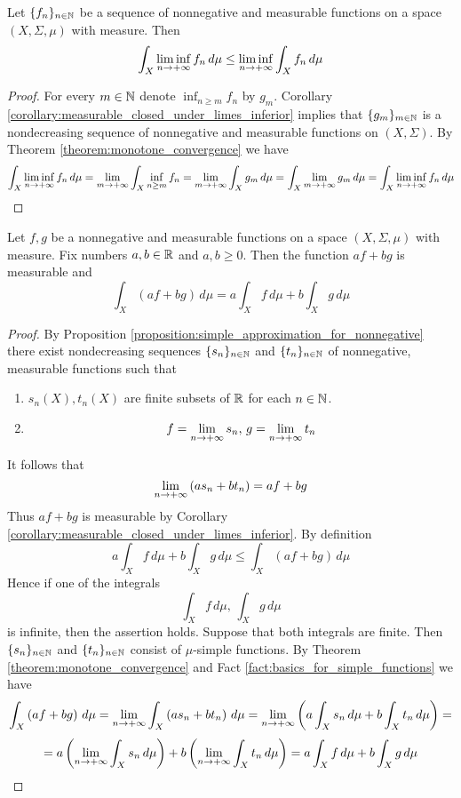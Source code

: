 \documentclass[10pt]{amsart}
\begin{document}
\begin{theorem}\label{theorem:fatous_lemma}
	Let $\{f_n\}_{n\in {\mathbb N}}$ be a sequence of nonnegative and measurable functions on a space $(X,\Sigma,\mu)$ with measure. Then
	$$\int_X\liminf_{n\rightarrow +\infty}f_n\,d\mu \leq \liminf_{n\rightarrow +\infty}\int_Xf_n\,d\mu$$
\end{theorem}
\begin{proof}
	For every $m\in {\mathbb N}$ denote $\inf_{n\geq m}f_n$ by $g_m$. Corollary \ref{corollary:measurable_closed_under_limes_inferior} implies that $\{g_m\}_{m\in {\mathbb N}}$ is a nondecreasing sequence of nonnegative and measurable functions on $(X,\Sigma)$. By Theorem \ref{theorem:monotone_convergence} we have
	$$\int_X\liminf_{n\rightarrow +\infty}f_n\,d\mu = \lim_{m\rightarrow +\infty}\int_X\inf_{n\geq m}f_n = \lim_{m\rightarrow +\infty}\int_Xg_m\,d\mu = \int_X\lim_{m\rightarrow +\infty}g_m\,d\mu = \int_X\liminf_{n\rightarrow +\infty}f_n\,d\mu$$
\end{proof}

\begin{proposition}\label{proposition:integral_is_linear}
	Let $f,g$ be a nonnegative and measurable functions on a space $(X,\Sigma,\mu)$ with measure. Fix numbers $a, b\in {\mathbb R}$ and $a, b \geq 0$. Then the function $a f+b  g$ is measurable and
	$$\int_X\left(a f+b  g\right)\,d\mu = a \int_Xf\,d\mu + b \int_Xg\,d\mu$$
\end{proposition}
\begin{proof}
	By Proposition \ref{proposition:simple_approximation_for_nonnegative} there exist nondecreasing sequences $\{s_n\}_{n\in {\mathbb N}}$ and $\{t_n\}_{n\in {\mathbb N}}$ of nonnegative, measurable functions such that
	\begin{enumerate}[label=\textbf{(\arabic*)}, leftmargin=*]
		\item $s_n(X),t_n(X)$ are finite subsets of ${\mathbb R}$ for each $n\in {\mathbb N}$.
		\item $$f = \lim_{n\rightarrow +\infty}s_n,\,g = \lim_{n\rightarrow +\infty}t_n$$
	\end{enumerate}
	It follows that
	$$\lim_{n \rightarrow +\infty}\left(as_n + bt_n\right) = af + bg$$
	Thus $af+bg$ is measurable by Corollary \ref{corollary:measurable_closed_under_limes_inferior}.
	By definition
	$$a \int_Xf\,d\mu + b \int_Xg\,d\mu \leq \int_X\left(a f+b  g\right)\,d\mu $$
	Hence if one of the integrals
	$$\int_Xf\,d\mu,\,\int_Xg\,d\mu$$
	is infinite, then the assertion holds. Suppose that both integrals are finite. Then $\{s_n\}_{n\in {\mathbb N}}$ and $\{t_n\}_{n\in {\mathbb N}}$ consist of $\mu$-simple functions. By Theorem \ref{theorem:monotone_convergence} and Fact \ref{fact:basics_for_simple_functions} we have
	$$\int_X\left(a f + b g\right)\,d\mu = \lim_{n\rightarrow +\infty}\int_X\left(a s_n + b t_n\right)\,d\mu = \lim_{n\rightarrow +\infty}\left(a \int_Xs_n\,d\mu + b \int_Xt_n\,d\mu\right) =$$
	$$=a  \left(\lim_{n\rightarrow +\infty}\int_Xs_n\,d\mu\right) + b \left(\lim_{n\rightarrow +\infty}\int_Xt_n\,d\mu\right) = a \int_Xf\,d\mu + b \int_Xg\,d\mu$$
\end{proof}
\end{document}
